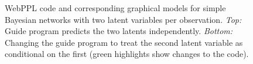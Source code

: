 \begin{figure}
\caption{WebPPL code and corresponding graphical models for simple Bayesian networks with two latent variables per observation. \emph{Top:} Guide program predicts the two latents independently. \emph{Bottom:} Changing the guide program to treat the second latent variable as conditional on the first (green highlights show changes to the code).}
\label{fig:bn_twoLatent}
\end{figure}

